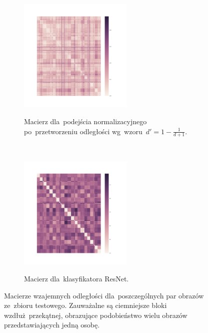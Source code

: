 \documentclass[11pt,a4paper]{article}
\begin{document}
\begin{figure}[H]
    \begin{subfigure}{\textwidth}
        \centering
        \includegraphics[width=0.6\textwidth]{res/img/normalized_distance_matrix.png}
        \label{subfig:normalized-distance-matrix}
        \caption{Macierz dla~podejścia normalizacyjnego po~przetworzeniu odległości wg~wzoru~$d' = 1 - \frac{1}{d + 1}$.}
    \end{subfigure}
    \\
    \begin{subfigure}{\textwidth}
        \centering
        \includegraphics[width=0.6\textwidth]{res/img/resnet_distance_matrix.png}
        \label{subfig:resnet-distance-matrix}
        \caption{Macierz dla~klasyfikatora ResNet.}
    \end{subfigure}
    \caption{Macierze wzajemnych odległości dla~poszczególnych par obrazów ze~zbioru testowego.
    Zauważalne są ciemniejsze bloki wzdłuż~przekątnej, obrazujące podobieństwo wielu obrazów przedstawiających jedną osobę.}
\end{figure}
\end{document}
